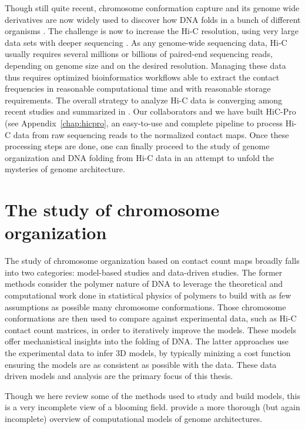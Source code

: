 Though still quite recent, chromosome conformation capture and its genome
wide derivatives are now widely used to discover how DNA folds in a bunch of
different organisms \citep{duan:three-dimensional, sexton:three-dimensional,
tanizawa:mapping, ay:three-dimensional}. The challenge is now to increase the
Hi-C resolution, using very large data sets with deeper sequencing
\citep{rao:3d, jin:high-resolution}. As any genome-wide sequencing data, Hi-C
usually requires several millions or billions of paired-end sequencing reads,
depending on genome size and on the desired resolution. Managing these data
thus requires optimized bioinformatics workflows able to extract the contact
frequencies in reasonable computational time and with reasonable storage
requirements. The overall strategy to analyze Hi-C data is converging among
recent studies and summarized in \cite{lajoie:hitchhiker}. Our collaborators
and we have built HiC-Pro (see Appendix~\ref{chap:hicpro},
an easy-to-use and complete pipeline to process
Hi-C data from raw sequencing reads to the normalized contact maps. Once these
processing steps are done, one can finally proceed to the study of genome
organization and DNA folding from Hi-C data in an attempt to unfold the
mysteries of genome architecture.

\section{The study of chromosome organization}

The study of chromosome organization based on contact count maps broadly
falls into two categories: model-based studies and data-driven studies. The
former methods consider the polymer nature of DNA to leverage the theoretical
and computational work done in statistical physics of polymers to build with
as few assumptions as possible many chromosome conformations. Those chromosome
conformations are then used to compare against experimental data, such as Hi-C
contact count matrices, in order to iteratively improve the models. These
models offer mechanistical insights into the folding of DNA. The latter
approaches use the experimental data to infer 3D models, by typically minizing
a cost function ensuring the models are as consistent as possible with the
data. These data driven models and analysis are the primary focus of this
thesis.

Though we here review some of the methods used to study and build models, this
is a very incomplete view of a blooming field. \citet{rosa:computational}
provide a more thorough (but again incomplete) overview of computational models
of genome architectures.

